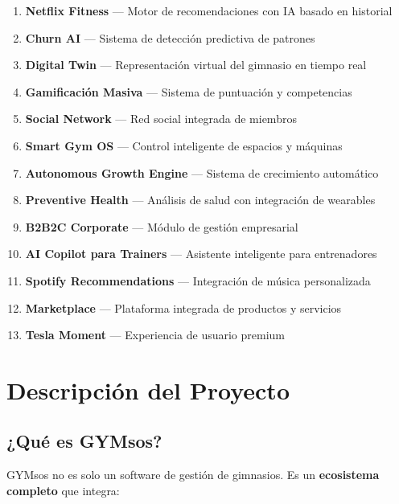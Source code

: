 \documentclass[11pt,a4paper]{article}
\begin{document}
\begin{enumerate}
    \item \textbf{Netflix Fitness} — Motor de recomendaciones con IA basado en historial
    \item \textbf{Churn AI} — Sistema de detección predictiva de patrones
    \item \textbf{Digital Twin} — Representación virtual del gimnasio en tiempo real
    \item \textbf{Gamificación Masiva} — Sistema de puntuación y competencias
    \item \textbf{Social Network} — Red social integrada de miembros
    \item \textbf{Smart Gym OS} — Control inteligente de espacios y máquinas
    \item \textbf{Autonomous Growth Engine} — Sistema de crecimiento automático
    \item \textbf{Preventive Health} — Análisis de salud con integración de wearables
    \item \textbf{B2B2C Corporate} — Módulo de gestión empresarial
    \item \textbf{AI Copilot para Trainers} — Asistente inteligente para entrenadores
    \item \textbf{Spotify Recommendations} — Integración de música personalizada
    \item \textbf{Marketplace} — Plataforma integrada de productos y servicios
    \item \textbf{Tesla Moment} — Experiencia de usuario premium
\end{enumerate}

\section{Descripción del Proyecto}

\subsection{¿Qué es GYMsos?}

GYMsos no es solo un software de gestión de gimnasios. Es un \textbf{ecosistema completo} que integra:
\end{document}
